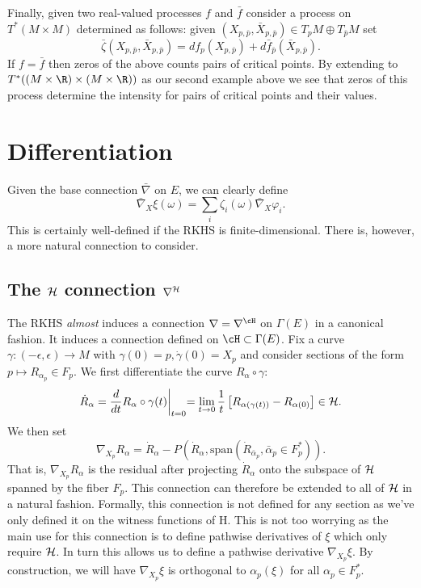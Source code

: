 \documentclass{article}
\begin{document}
Finally, given two real-valued processes $f$ and $\bar{f}$ consider a process on $T^*(M \times M)$ determined as follows: given $(X_{p,\bar{p}}, \bar{X}_{p,\bar{p}}) \in T_pM \oplus T_{\bar{p}}M$
set
$$
\bar{\zeta}(X_{p,\bar{p}}, \bar{X}_{p,\bar{p}}) = df_p(X_{p,\bar{p}}) + d\bar{f}_{\bar{p}}(\bar{X}_{p,\bar{p}}).
$$ If $f=\bar{f}$ then zeros of the above counts pairs of critical
points. By extending to $T^*((M \times \R) \times (M \times \R))$ as
our second example above we see that zeros of this process determine
the intensity for pairs of critical points and their values.

\section{Differentiation}

Given the base connection $\bar{\nabla}$ on $E$, we can clearly define
$$
\bar{\nabla}_X\xi(\omega) = \sum_i \zeta_i(\omega) \bar{\nabla}_X \varphi_i.
$$
This is certainly well-defined if the RKHS is finite-dimensional. There is, however, a more natural
connection to consider.

\subsection{The ${\cal H}$ connection $\nabla^{\cal H}$}

The RKHS {\em almost} induces a connection $\nabla=\nabla^{\cH}$ on $\Gamma(E)$  in a canonical fashion.
It induces a connection defined on $\cH \subset \Gamma(E)$.
Fix a curve $\gamma:(-\epsilon,\epsilon) \to M$ with $\gamma(0)=p, \dot{\gamma}(0)=X_p$
and consider sections of the form
$p \mapsto R_{\alpha_p} \in F_p$. We first differentiate the curve $R_{\alpha} \circ \gamma$:
\begin{equation}
\dot{R}_{\alpha} = \frac{d}{dt} R_{\alpha} \circ \gamma(t) \biggl|_{t=0} = \lim_{t \to 0} \frac{1}{t} \left[ R_{\alpha(\gamma(t))} - R_{\alpha(0)}\right] \in {\cal H}.
\end{equation}
We then set
$$
\nabla_{X_p}R_{\alpha} = \dot{R}_{\alpha} - P(\dot{R}_{\alpha}, \text{span}(\dot{R}_{\bar{\alpha}_p}, \bar{\alpha}_p \in F_p^*)).
$$
That is, $\nabla_{X_p}R_{\alpha}$ is the residual after projecting $\dot{R}_{\alpha}$ onto the subspace of ${\cal H}$ spanned by the fiber $F_p$.
This connection can therefore be extended to all of ${\cal H}$ in a natural fashion.
Formally, this connection is not defined for any section as we've only defined it on the witness functions of {\cal H}. This is not too worrying as the main use for this connection is to define pathwise derivatives of $\xi$ which only require
${\cal H}$. In turn this allows us to define
a pathwise derivative $\nabla_{X_p}\xi$. By construction, we will have $\nabla_{X_p}\xi$ is orthogonal
to $\alpha_p(\xi)$ for all $\alpha_p \in F_p^*$.
\end{document}
